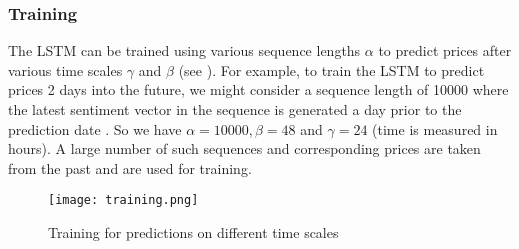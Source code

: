 \documentclass[a4paper]{article}
\begin{document}
\subsubsection{Training}
The LSTM can be trained using various sequence lengths $\alpha$ to predict prices after various time scales $\gamma$ and $\beta$ \cite{TrainingTimeScales} (see ). For example, to train the LSTM to predict prices 2 days into the future, we might consider a sequence length of 10000 where the latest sentiment vector in the sequence is generated a day prior to the prediction date . So we have $\alpha=10000, \beta=48$ and $\gamma=24$ (time is measured in hours). A large number of such sequences and corresponding prices are taken from the past and are used for training.

\begin{figure}[h!] \centering
	\texttt{[image: training.png]}
	\caption{Training for predictions on different time scales} \label{fig:training}
\end{figure}
\end{document}
